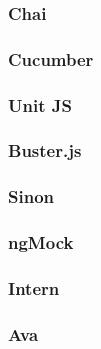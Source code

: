 \subsubsection{Chai}
\label{sec:Chai}

\subsubsection{Cucumber}
\label{sec:Cucumber}

\subsubsection{Unit JS}
\label{sec:UnitJS}

\subsubsection{Buster.js}
\label{sec:BusterJS}

\subsubsection{Sinon}
\label{sec:Sinon}

\subsubsection{ngMock}
\label{sec:ngMock}

\subsubsection{Intern}
\label{sec:Intern}

\subsubsection{Ava}
\label{sec:Ava}
